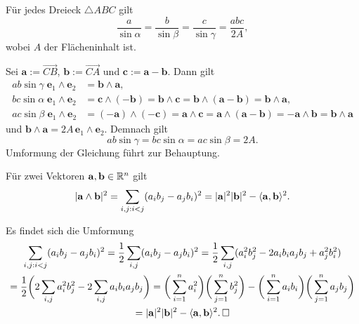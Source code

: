 \newpage
\begin{Satz}[Sinussatz]
Für jedes Dreieck $\triangle ABC$ gilt
\[\frac{a}{\sin\alpha} = \frac{b}{\sin\beta} = \frac{c}{\sin\gamma}
= \frac{abc}{2A},\]
wobei $A$ der Flächeninhalt ist.
\end{Satz}
\begin{Beweis}
Sei $\mathbf a := \overrightarrow{CB}$, $\mathbf b:= \overrightarrow{CA}$
und $\mathbf c := \mathbf a-\mathbf b$. Dann gilt
\begin{align*}
ab\sin\gamma\;\mathbf e_1\wedge\mathbf e_2 &= \mathbf b\wedge\mathbf a,\\
bc\sin\alpha\;\mathbf e_1\wedge\mathbf e_2 &= \mathbf c\wedge(-\mathbf b)
= \mathbf b\wedge\mathbf c = \mathbf b\wedge (\mathbf a-\mathbf b)
= \mathbf b\wedge\mathbf a,\\
ac\sin\beta\;\mathbf e_1\wedge\mathbf e_2 &= (-\mathbf a)\wedge (-\mathbf c)
= \mathbf a\wedge\mathbf c
= \mathbf a\wedge(\mathbf a-\mathbf b)
= -\mathbf a\wedge\mathbf b = \mathbf b\wedge\mathbf a
\end{align*}
und $\mathbf b\wedge\mathbf a = 2A\,\mathbf e_1\wedge\mathbf e_2$.
Demnach gilt
\[ab\sin\gamma = bc\sin\alpha = ac\sin\beta = 2A.\]
Umformung der Gleichung führt zur Behauptung.\;\qedsymbol
\end{Beweis}

\begin{Satz}\newlinefirst
Für zwei Vektoren $\mathbf{a},\mathbf{b}\in\mathbb R^n$ gilt
\[|\mathbf{a}\wedge\mathbf{b}|^2 = \sum_{i,j:i<j}(a_i b_j - a_j b_i)^2 
= |\mathbf{a}|^2|\mathbf{b}|^2 - \langle\mathbf{a},\mathbf{b}\rangle^2.\]
\end{Satz}
\begin{Beweis}
Es findet sich die Umformung
\begin{gather*}
\sum_{i,j:i<j}(a_i b_j - a_j b_i)^2 = \frac{1}{2}\sum_{i,j}(a_i b_j - a_j b_i)^2
= \frac{1}{2}\sum_{i,j}(a_i^2 b_j^2 - 2a_i b_i a_j b_j + a_j^2 b_i^2)\\
= \frac{1}{2}\bigg(2\sum_{i,j} a_i^2 b_j^2 - 2\sum_{i,j}a_i b_i a_j b_j\bigg)
= \bigg(\sum_{i=1}^n a_i^2\bigg)\bigg(\sum_{j=1}^n b_j^2\bigg)
- \bigg(\sum_{i=1}^n a_i b_i\bigg)\bigg(\sum_{j=1}^n a_j b_j\bigg)\\
= |\mathbf{a}|^2 |\mathbf{b}|^2 - \langle\mathbf{a},\mathbf{b}\rangle^2.\,\square
\end{gather*}
\end{Beweis}
